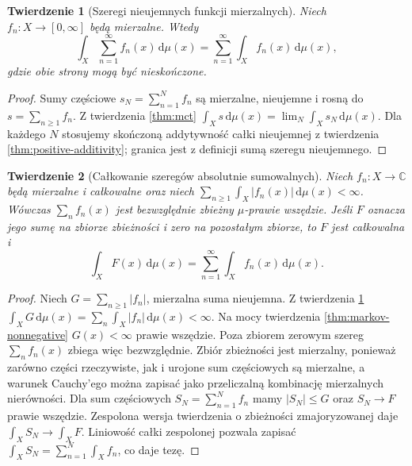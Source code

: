 \documentclass[11pt,a4paper,oneside]{book}
\numberwithin{equation}{chapter}
\theoremstyle{plain}
\newtheorem{twierdzenie}{Twierdzenie}[chapter]
\theoremstyle{definition}
\theoremstyle{remark}
\begin{document}
\begin{twierdzenie}[Szeregi nieujemnych funkcji mierzalnych]
\label{thm:sum-nonnegative-integrals}
Niech $f_n:X\to[0,\infty]$ będą mierzalne. Wtedy
\begin{equation}\label{eq:sum-nonnegative-integrals}
\int_X\sum_{n=1}^{\infty}f_n(x)\,\mathrm d\mu(x)
=\sum_{n=1}^{\infty}\int_Xf_n(x)\,\mathrm d\mu(x),
\end{equation}
gdzie obie strony mogą być nieskończone.
\end{twierdzenie}
\begin{proof}
Sumy częściowe $s_N=\sum_{n=1}^N f_n$ są
mierzalne, nieujemne i rosną do
$s=\sum_{n\ge1}f_n$. Z twierdzenia \ref{thm:mct}
$\int_Xs\,\mathrm d\mu(x)=\lim_N\int_Xs_N\,\mathrm d\mu(x)$.
Dla każdego $N$ stosujemy skończoną addytywność
całki nieujemnej z twierdzenia
\ref{thm:positive-additivity}; granica jest
z definicji sumą szeregu nieujemnego.
\end{proof}

\begin{twierdzenie}[Całkowanie szeregów absolutnie sumowalnych]
\label{thm:sum-absolutely-integrable}
Niech $f_n:X\to\mathbb C$ będą mierzalne i
całkowalne oraz niech
$\sum_{n\ge1}\int_X|f_n(x)|\,\mathrm d\mu(x)<\infty$.
Wówczas $\sum_nf_n(x)$ jest bezwzględnie zbieżny
$\mu$-prawie wszędzie. Jeśli $F$ oznacza jego sumę
na zbiorze zbieżności i zero na pozostałym zbiorze,
to $F$ jest całkowalna i
\begin{equation}\label{eq:interchange-series}
\int_XF(x)\,\mathrm d\mu(x)
=\sum_{n=1}^{\infty}\int_Xf_n(x)\,\mathrm d\mu(x).
\end{equation}
\end{twierdzenie}
\begin{proof}
Niech $G=\sum_{n\ge1}|f_n|$, mierzalna suma
nieujemna. Z twierdzenia
\ref{thm:sum-nonnegative-integrals}
$\int_XG\,\mathrm d\mu(x)=
\sum_n\int_X|f_n|\,\mathrm d\mu(x)<\infty$.
Na mocy twierdzenia \ref{thm:markov-nonnegative}
$G(x)<\infty$ prawie wszędzie. Poza zbiorem
zerowym szereg $\sum_nf_n(x)$ zbiega więc
bezwzględnie. Zbiór zbieżności jest mierzalny,
ponieważ zarówno części rzeczywiste, jak i
urojone sum częściowych są mierzalne, a warunek
Cauchy'ego można zapisać jako przeliczalną
kombinację mierzalnych nierówności.
Dla sum częściowych $S_N=\sum_{n=1}^Nf_n$
mamy $|S_N|\le G$ oraz $S_N\to F$ prawie wszędzie.
Zespolona wersja twierdzenia o zbieżności zmajoryzowanej
daje $\int_XS_N\to\int_XF$. Liniowość całki
zespolonej pozwala zapisać
$\int_XS_N=\sum_{n=1}^N\int_Xf_n$, co daje tezę.
\end{proof}
\end{document}
